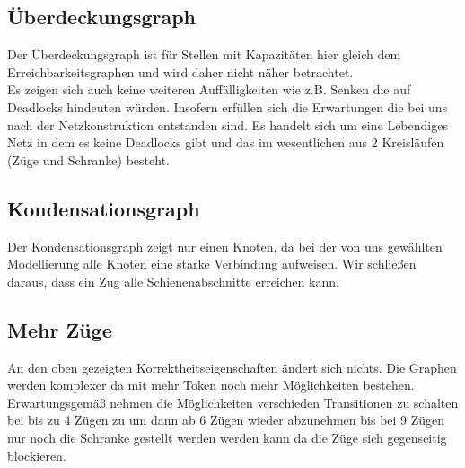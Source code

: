 \documentclass[10pt]{scrartcl}
\begin{document}
\subsection{Überdeckungsgraph}
Der Überdeckungsgraph ist für Stellen mit Kapazitäten hier gleich dem Erreichbarkeitsgraphen und wird daher nicht näher betrachtet.\\
Es zeigen sich auch keine weiteren Auffälligkeiten wie z.B. Senken die auf Deadlocks hindeuten würden. Insofern erfüllen sich die Erwartungen die bei uns nach der Netzkonstruktion entstanden sind. Es handelt sich um eine Lebendiges Netz in dem es keine Deadlocks gibt und das im wesentlichen aus 2 Kreisläufen (Züge und Schranke) besteht.

\subsection{Kondensationsgraph}
Der Kondensationsgraph zeigt nur einen Knoten, da bei der von uns gewählten Modellierung alle Knoten eine starke Verbindung aufweisen. Wir schließen daraus, dass ein Zug alle Schienenabschnitte erreichen kann. 

\subsection{Mehr Züge}	
An den oben gezeigten Korrektheitseigenschaften ändert sich nichts. Die Graphen werden komplexer da mit mehr Token noch mehr Möglichkeiten bestehen. Erwartungsgemäß nehmen die Möglichkeiten verschieden Transitionen zu schalten bei bis zu 4 Zügen zu um dann ab 6 Zügen wieder abzunehmen bis bei 9 Zügen nur noch die Schranke gestellt werden werden kann da die Züge sich gegenseitig blockieren.

		
\end{document}
